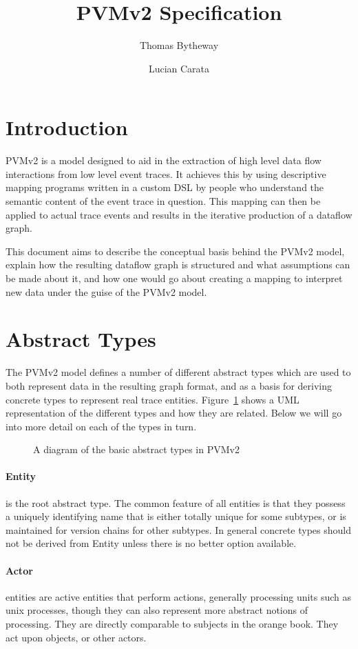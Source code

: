 \documentclass[12pt,twoside,a4paper]{article}
\newcommand{\para}[1]{\paragraph{#1\\}}
\begin{document}
\title{PVMv2 Specification}
\author{Thomas Bytheway \and Lucian Carata}

\maketitle

\clearpage

\section{Introduction}
\label{sec:intro}
PVMv2 is a model designed to aid in the extraction of high level data flow interactions from low level event traces. It achieves this by using descriptive mapping programs written in a custom DSL by people who understand the semantic content of the event trace in question. This mapping can then be applied to actual trace events and results in the iterative production of a dataflow graph.

This document aims to describe the conceptual basis behind the PVMv2 model, explain how the resulting dataflow graph is structured and what assumptions can be made about it, and how one would go about creating a mapping to interpret new data under the guise of the PVMv2 model.

\section{Abstract Types}
\label{sec:ty}
The PVMv2 model defines a number of different abstract types which are used to both represent data in the resulting graph format, and as a basis for deriving concrete types to represent real trace entities. Figure~\ref{fig:types} shows a UML representation of the different types and how they are related. Below we will go into more detail on each of the types in turn.

\begin{figure}[h]
\centering

\caption{A diagram of the basic abstract types in PVMv2}
\label{fig:types}
\end{figure}

\para{Entity}
\label{sec:ty:entity}
 is the root abstract type. The common feature of all entities is that they possess a uniquely identifying name that is either totally unique for some subtypes, or is maintained for version chains for other subtypes. In general concrete types should not be derived from Entity unless there is no better option available.

\para{Actor}
\label{sec:ty:actor}
 entities are active entities that perform actions, generally processing units such as unix processes, though they can also represent more abstract notions of processing. They are directly comparable to subjects in the orange book. They act upon objects, or other actors.
\end{document}
